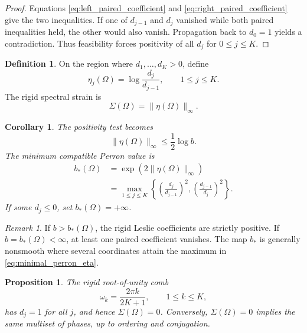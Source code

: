 \documentclass[11pt]{amsart}
\numberwithin{equation}{section}
\theoremstyle{plain}
\newtheorem{proposition}[theorem]{Proposition}
\newtheorem{corollary}[theorem]{Corollary}
\theoremstyle{definition}
\newtheorem{definition}[theorem]{Definition}
\theoremstyle{remark}
\newtheorem{remark}[theorem]{Remark}
\begin{document}
\begin{proof}
Equations \eqref{eq:left_paired_coefficient} and \eqref{eq:right_paired_coefficient} give the two inequalities.  If one of $d_{j-1}$ and $d_j$ vanished while both paired inequalities held, the other would also vanish.  Propagation back to $d_0=1$ yields a contradiction.  Thus feasibility forces positivity of all $d_j$ for $0\leq j\leq K$.
\end{proof}

\begin{definition}
\label{def:eta_coordinates}
On the region where $d_1,\ldots,d_K>0$, define
\begin{equation}
\eta_j(\Omega)=\log\frac{d_j}{d_{j-1}},
\qquad 1\leq j\leq K.
\label{eq:eta_definition}
\end{equation}
The rigid spectral strain is
\begin{equation}
\Sigma(\Omega)=\|\eta(\Omega)\|_\infty.
\label{eq:spectral_strain}
\end{equation}
\end{definition}

\begin{corollary}
\label{cor:box_criterion}
The positivity test becomes
\begin{equation}
\|\eta(\Omega)\|_\infty
\leq\frac12\log b.
\label{eq:eta_box}
\end{equation}
The minimum compatible Perron value is
\begin{align}
b_*(\Omega)
&=\exp\left(2\|\eta(\Omega)\|_\infty\right)
\label{eq:minimal_perron_eta}\\
&=\max_{1\leq j\leq K}
\left\{
\left(\frac{d_j}{d_{j-1}}\right)^2,
\left(\frac{d_{j-1}}{d_j}\right)^2
\right\}.
\label{eq:minimal_perron_ratios}
\end{align}
If some $d_j\leq0$, set $b_*(\Omega)=+\infty$.
\end{corollary}

\begin{remark}
\label{rem:minimal_perron_boundary}
If $b>b_*(\Omega)$, the rigid Leslie coefficients are strictly positive.  If $b=b_*(\Omega)<\infty$, at least one paired coefficient vanishes.  The map $b_*$ is generally nonsmooth where several coordinates attain the maximum in \eqref{eq:minimal_perron_eta}.
\end{remark}

\begin{proposition}
\label{prop:comb_zero_strain}
The rigid root-of-unity comb
\begin{equation}
\omega_k=\frac{2\pi k}{2K+1},
\qquad 1\leq k\leq K,
\label{eq:comb_phases}
\end{equation}
has $d_j=1$ for all $j$, and hence $\Sigma(\Omega)=0$.  Conversely, $\Sigma(\Omega)=0$ implies the same multiset of phases, up to ordering and conjugation.
\end{proposition}
\end{document}
